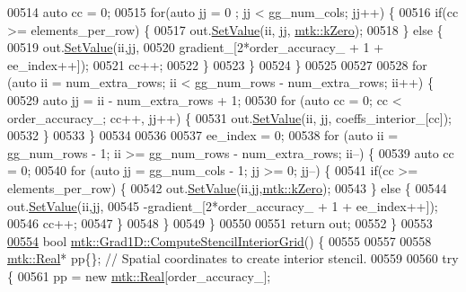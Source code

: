 \begin{DoxyCode}
{{00514     \textcolor{keyword}{auto} cc = 0;
00515     \textcolor{keywordflow}{for}(\textcolor{keyword}{auto} jj = 0 ; jj < gg\_num\_cols; jj++) \{
00516       \textcolor{keywordflow}{if}(cc >= elements\_per\_row) \{
00517         out.\hyperlink{classmtk_1_1DenseMatrix_a784ce5784109ac86bfb9d8562b334b13}{SetValue}(ii, jj, \hyperlink{group__c01-roots_ga59a451a5fae30d59649bcda274fea271}{mtk::kZero});
00518       \} \textcolor{keywordflow}{else} \{
00519         out.\hyperlink{classmtk_1_1DenseMatrix_a784ce5784109ac86bfb9d8562b334b13}{SetValue}(ii,jj,
00520                      gradient\_[2*order\_accuracy\_ + 1 + ee\_index++]);
00521         cc++;
00522       \}
00523     \}
00524   \}
00525 
00527 
00528   \textcolor{keywordflow}{for} (\textcolor{keyword}{auto} ii = num\_extra\_rows; ii < gg\_num\_rows - num\_extra\_rows; ii++) \{
00529     \textcolor{keyword}{auto} jj = ii - num\_extra\_rows + 1;
00530     \textcolor{keywordflow}{for} (\textcolor{keyword}{auto} cc = 0; cc < order\_accuracy\_; cc++, jj++) \{
00531       out.\hyperlink{classmtk_1_1DenseMatrix_a784ce5784109ac86bfb9d8562b334b13}{SetValue}(ii, jj, coeffs\_interior\_[cc]);
00532     \}
00533   \}
00534 
00536 
00537   ee\_index = 0;
00538   \textcolor{keywordflow}{for} (\textcolor{keyword}{auto} ii = gg\_num\_rows - 1; ii >= gg\_num\_rows - num\_extra\_rows; ii--) \{
00539     \textcolor{keyword}{auto} cc = 0;
00540     \textcolor{keywordflow}{for} (\textcolor{keyword}{auto} jj = gg\_num\_cols - 1; jj >= 0; jj--) \{
00541       \textcolor{keywordflow}{if}(cc >= elements\_per\_row) \{
00542         out.\hyperlink{classmtk_1_1DenseMatrix_a784ce5784109ac86bfb9d8562b334b13}{SetValue}(ii,jj,\hyperlink{group__c01-roots_ga59a451a5fae30d59649bcda274fea271}{mtk::kZero});
00543       \} \textcolor{keywordflow}{else} \{
00544         out.\hyperlink{classmtk_1_1DenseMatrix_a784ce5784109ac86bfb9d8562b334b13}{SetValue}(ii,jj,
00545                      -gradient\_[2*order\_accuracy\_ + 1 + ee\_index++]);
00546         cc++;
00547       \}
00548      \}
00549   \}
00550 
00551   \textcolor{keywordflow}{return} out;
00552 \}
00553 
\hypertarget{mtk__grad__1d_8cc_source_l00554}{}\hyperlink{classmtk_1_1Grad1D_ad6df25cc9dfc85ff8562ae3605486976}{00554} \textcolor{keywordtype}{bool} \hyperlink{classmtk_1_1Grad1D_ad6df25cc9dfc85ff8562ae3605486976}{mtk::Grad1D::ComputeStencilInteriorGrid}() \{
00555 
00557 
00558   \hyperlink{group__c01-roots_gac080bbbf5cbb5502c9f00405f894857d}{mtk::Real}* pp\{\}; \textcolor{comment}{// Spatial coordinates to create interior stencil.}
00559 
00560   \textcolor{keywordflow}{try} \{
00561     pp = \textcolor{keyword}{new} \hyperlink{group__c01-roots_gac080bbbf5cbb5502c9f00405f894857d}{mtk::Real}[order\_accuracy\_];
}}
\end{DoxyCode}
